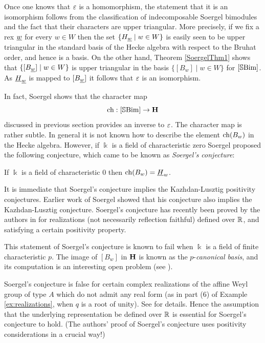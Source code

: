 Once one knows that $\varepsilon$ is a homomorphism, the statement that it is an isomorphism follows from the  classification of indecomposable Soergel bimodules and the fact that their characters are upper triangular. More precisely, if we fix a rex $\underline{w}$ for every $w \in W$ then the set $\{ H_{\underline{w}} \; | \; w \in W\}$ is easily seen to be upper triangular in the standard basis of the Hecke algebra with respect to the Bruhat order, and hence is a basis. On the other hand, Theorem \ref{SoergelThm1} shows that $\{ [B_{\underline{w}}] \; | \; w \in W \}$ is upper triangular in the basis $\{ [B_w] \; | \; w \in W \}$ for $[\mathbb{S}\textrm{Bim}]$. As $\underline{H}_{\underline{w}}$ is mapped to $[B_{\underline{w}}]$ it follows that $\varepsilon$ is an isomorphism.

In fact, Soergel shows that the character map
\[
\operatorname{ch} : [\mathbb{S}\textrm{Bim}] \rightarrow {\mathbf H}
\]
 discussed in previous section provides an inverse to $\varepsilon$. The character map is rather subtle. In general it is not known how to describe the element $\operatorname{ch}(B_w)$ in the Hecke algebra. However, if $\Bbbk$ is a field of characteristic zero Soergel proposed the following conjecture, which came to be known as \emph{Soergel's conjecture}:
 
\begin{conj} If $\Bbbk$ is a field of characteristic $0$ then $\operatorname{ch}(B_w) = \underline{H}_w$. \end{conj}

It is immediate that Soergel's conjecture implies the Kazhdan-Lusztig positivity conjectures. Earlier work of Soergel \cite{Soe1} showed that his conjecture also implies the
Kazhdan-Lusztig conjecture. Soergel's conjecture has recently been proved by the authors in \cite{EWHodge} for realizations (not necessarily reflection faithful) defined over ${\mathbb{R}}$, and satisfying a certain positivity property.

\begin{remark} This statement of Soergel's conjecture is known to fail when $\Bbbk$ is a field of finite characteristic $p$. The image of $[B_w]$ in ${\mathbf H}$ is known as the $p$-\emph{canonical basis}, and its computation is an interesting open problem (see \cite{Wpcan}).
\end{remark}

\begin{remark} Soergel's conjecture is false for certain complex realizations of the affine Weyl group of type $A$ which do not admit any real form (as in part (6) of Example
\ref{ex:realizations}, when $q$ is a root of unity). See \cite{EQAGS} for details. Hence the assumption that the underlying representation be defined over ${\mathbb{R}}$ is essential for Soergel's
conjecture to hold. (The authors' proof of Soergel's conjecture uses positivity considerations in a crucial way!) \end{remark}

